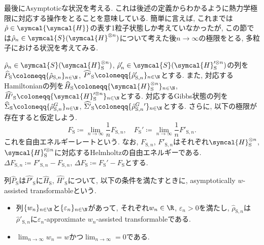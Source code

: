 

最後にAsymptoticな状況を考える. 
これは後述の定義からわかるように熱力学極限に対応する操作をとることを意味している. 
簡単に言えば, これまでは$\hat{\rho}\in\symcal{\symcal{H}}$の表す1粒子状態しか考えていなかったが, この節では$\hat{\rho}_n\in\symcal{S}(\symcal{H}^{\otimes n})$について考えた後$n\to\infty$の極限をとる, 多粒子における状況を考えてみる.

$\hat{\rho}_n\in\symcal{S}(\symcal{H}_{\text{S}}^{\otimes n})$, $\hat{\rho}_n'\in\symcal{S}(\symcal{H}_{\text{S}}'^{\otimes n})$の列を$\widehat{P}_{\text{S}}\coloneqq \{\hat{\rho}_{\text{S}, n}\}_{n\in\N}$, $\widehat{P'}_{\text{S}}\coloneqq \{\hat{\rho}'_{\text{S}, n}\}_{n\in\N}$とする. 
また, 対応するHamiltonianの列を$\widehat{H}_{\text{S}}\coloneqq \{\symcal{H}_{\text{S}}^{\otimes n}\}_{n\in\N}$, $\widehat{H'}_{\text{S}}\coloneqq \{\symcal{H}_{\text{S}}'^{\otimes n}\}_{n\in\N}$とする. 
対応するGibbs状態の列を$\widehat{\Sigma}_{\text{S}}\coloneqq \{\hat{\rho}^{G}_{\text{S}, n}\}_{n\in\N}$, $\widehat{\Sigma '}_{\text{S}}\coloneqq \{\hat{\rho}^{G}_{\text{S}, n}{}'\}_{n\in\N}$とする. 
さらに, 以下の極限が存在すると仮定しよう. 
\begin{equation}
  F_{\text{S}}\coloneqq\lim_{n\to\infty}\frac{1}{n}F_{\text{S}, n}, \quad F_{\text{S}}'\coloneqq\lim_{n\to\infty}\frac{1}{n}F'_{\text{S}, n}. 
\end{equation}
これを自由エネルギーレートという. 
なお, $F_{\text{S}, n}$, $F'_{\text{S}, n}$はそれぞれ$\symcal{H}_{\text{S}}^{\otimes n}$, $\symcal{H}_{\text{S}}'^{\otimes n}$に対応するHelmholtzの自由エネルギーである. 
$\Delta F_{\text{S}, n}\coloneqq F'_{\text{S}, n}-F_{\text{S}, n}$, $\Delta F_{\text{S}}\coloneqq F_{\text{S}}'-F_{\text{S}}$とする. 

\begin{mydfn}
  列$\widehat{P}_{\text{S}}$は$\widehat{P'}_{\text{S}}$に$\widehat{H}_{\text{S}}$, $\widehat{H'}_{\text{S}}$について, 以下の条件を満たすときに, asymptotically $w$-assisted transformableという. 
  \begin{itemize}
    \item 列$\{w_n\}_{n\in\N}$と$\{\varepsilon_n\}_{n\in\N}$があって, それぞれ$w_n\in\R$, $\varepsilon_n>0$を満たし, $\hat{\rho}_{\text{S}, n}$は$\hat{\rho}'_{\text{S}, n}$に$\varepsilon_n$-approximate $w_n$-assisted transformableである. 
    \item $\lim_{n\to\infty}w_n=w$かつ$\lim_{n\to\infty}=0$である. 
  \end{itemize}
\end{mydfn}



